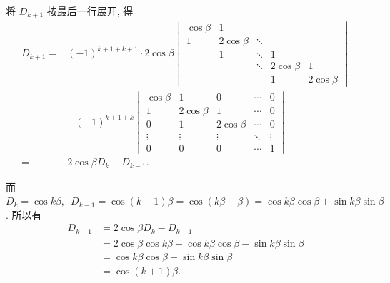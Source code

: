 \documentclass[12pt,fontset=fandol]{ctexart}
\begin{document}
\begin{solve}
\begin{enumerate}
            将 $D_{k+1}$ 按最后一行展开, 得
            \begin{align*}
                D_{k+1}={} & (-1)^{k+1+k+1} \cdot 2 \cos \beta
                \begin{vmatrix}
                    \cos \beta & 1            &        &              &              \\
                    1          & 2 \cos \beta & \ddots &              &              \\
                                & 1            & \ddots & 1            &              \\
                                &              & \ddots & 2 \cos \beta & 1            \\
                                &              &        & 1            & 2 \cos \beta
                \end{vmatrix} \\
                            & +(-1)^{k+1+k}
                \begin{vmatrix}
                    \cos \beta & 1            & 0            & \cdots & 0      \\
                    1          & 2 \cos \beta & 1            & \cdots & 0      \\
                    0          & 1            & 2 \cos \beta & \cdots & 0      \\
                    \vdots     & \vdots       & \vdots       & \ddots & \vdots \\
                    0          & 0            & 0            & \cdots & 1
                \end{vmatrix}       \\
                ={}        & 2\cos\beta D_k-D_{k-1}.
            \end{align*}

            而$D_{k}=\cos k \beta,\enspace
                D_{k-1}=\cos (k-1)\beta = \cos (k \beta-\beta) = \cos k \beta \cos \beta+\sin k \beta \sin \beta$. 所以有
            \begin{align*}
                D_{k+1} & = 2 \cos \beta D_{k}-D_{k-1}                                               \\
                        & =2 \cos \beta \cos k \beta-\cos k \beta \cos \beta-\sin k \beta \sin \beta \\
                        & =\cos k \beta \cos \beta-\sin k \beta \sin \beta                           \\
                        & =\cos (k+1) \beta.
            \end{align*}


\end{enumerate}
\end{solve}
\end{document}
